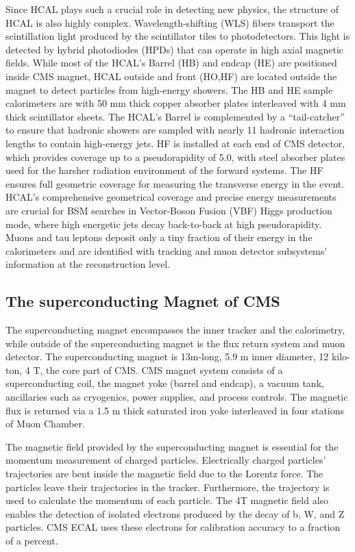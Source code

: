 Since HCAL plays such a crucial role in detecting new physics, the structure of HCAL is also highly complex.
Wavelength-shifting (WLS) fibers transport the scintillation light produced by the scintillator tiles to photodetectors.
This light is detected by hybrid photodiodes (HPDs) that can operate in high axial magnetic fields.
While most of the HCAL's Barrel (HB) and endcap (HE) are positioned inside CMS magnet, HCAL outside and front (HO,HF) are located outside the magnet to detect particles from high-energy showers.
The HB and HE sample calorimeters are with 50 mm
thick copper absorber plates interleaved with 4 mm thick scintillator sheets.
The HCAL's Barrel is complemented by a ``tail-catcher'' to ensure that hadronic showers are sampled with nearly 11 hadronic interaction lengths to contain high-energy jets.
HF is installed at each end of CMS detector, which provides coverage up to a pseudorapidity of 5.0, with steel absorber plates used for the harsher radiation environment of the forward systems.
The HF ensures full geometric coverage for measuring the transverse energy in the event.
HCAL's comprehensive geometrical coverage and precise energy measurements are crucial for BSM searches in Vector-Boson Fusion (VBF) Higgs production mode, where high energetic jets decay back-to-back at high pseudorapidity.
Muons and tau leptons deposit only a tiny fraction of their energy in the calorimeters and are identified with tracking and muon detector subsystems' information at the reconstruction level.

\subsection{The superconducting Magnet  of CMS}
The superconducting magnet encompasses the inner tracker and the calorimetry, while outside of the superconducting magnet is the flux return system and muon detector.
The superconducting magnet is 13m-long, 5.9 m inner diameter, 12 kilo-ton, 4 T, the core part of CMS.
CMS magnet system consists of a superconducting coil, the magnet yoke (barrel and endcap), a vacuum tank, ancillaries such as cryogenics, power supplies, and process controls.
The magnetic flux is returned via a 1.5 m thick saturated iron yoke interleaved in four stations of Muon Chamber.

The magnetic field provided by the superconducting magnet is essential for the momentum measurement of charged particles.
Electrically charged particles' trajectories are bent inside the magnetic field due to the Lorentz force.
The particles leave their trajectories in the tracker. 
Furthermore, the trajectory is used to calculate the momentum of each particle.
The 4T magnetic field also enables the detection of isolated electrons produced by the decay of b, W, and Z particles.
CMS ECAL uses these electrons for calibration accuracy to a fraction of a percent.
